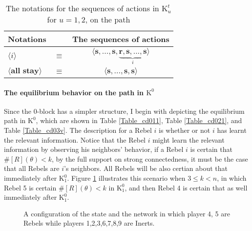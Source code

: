 \documentclass[12pt,letter]{article}
\newcommand{\Kappa}{\mathrm{K}}
\theoremstyle{definition}
\theoremstyle{remark}
\theoremstyle{claim}
\begin{document}
\begin{table}[!htbp]
\caption{The notations for the sequences of actions in $\Kappa^t_{u}$ for $u=1,2$, on the path}
\label{Table_msg_coordination}
\begin{center}
\begin{tabular}{l c c}
Notations & &The sequences of actions \\
\hline
\hline
$\langle i \rangle$ 				& $\equiv$ 			& $\langle \textbf{s},...,\textbf{s},\underbrace{\textbf{r},\textbf{s},...,\textbf{s}}_{i} \rangle$  \\
$\langle \textbf{all stay} \rangle$	 					& $\equiv$ 			& $\langle \textbf{s},...,\textbf{s},{\textbf{s}}\rangle$  \\
\hline
\end{tabular}
\end{center}
\end{table}


\paragraph{The equilibrium behavior on the path in $\Kappa^0$}
Since the $0$-block has a simpler structure, I begin with depicting the equilibrium path in $\Kappa^0$, which are shown in Table \ref{Table_cd011}, Table \ref{Table_cd021}, and Table \ref{Table_cd03v}. The description for a Rebel $i$ is whether or not $i$ has learnt the relevant information. Notice that the Rebel $i$ might learn the relevant information by observing his neighbors' behavior, if a Rebel $i$ is certain that $\#[R](\theta)<k$, by the full support on strong connectedness, it must be the case that all Rebels are $i$'s neighbors. All Rebels will be also certian about that immediately after $\Kappa^0_{1}$. Figure \ref{fig:central_less_k} illustrates this scenario when $3\leq k <n$, in which Rebel 5 is certain $\#[R](\theta)<k$ in $\Kappa^0_1$, and then Rebel 4 is certain that as well immediately after $\Kappa^0_1$.

\begin{figure}
\caption{A configuration of the state and the network in which player 4, 5 are Rebels while players 1,2,3,6,7,8,9 are Inerts.}
\label{fig:central_less_k}
\begin{center}
\end{center}
\end{figure}
\end{document}
